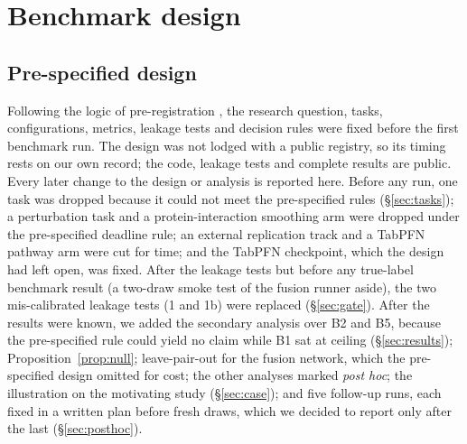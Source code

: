 \documentclass[10pt,letterpaper]{article}
\begin{document}
\section{Benchmark design}

\subsection{Pre-specified design}
Following the logic of pre-registration \citep{nosek2018prereg}, the research question, tasks,
configurations, metrics, leakage tests and decision rules were fixed before the first benchmark run. The
design was not lodged with a public registry, so its timing rests on our own record; the code, leakage tests
and complete results are public. Every later change to the design or analysis is reported here. Before
any run, one task was
dropped because it could not meet the pre-specified rules (\S\ref{sec:tasks}); a perturbation task and a
protein-interaction smoothing arm were dropped under the pre-specified deadline rule; an external replication
track and a TabPFN pathway arm were cut for time; and the TabPFN checkpoint, which the design had left open, was
fixed. After the leakage tests but before any true-label benchmark result (a two-draw smoke test of the fusion
runner aside), the two mis-calibrated leakage tests (1 and 1b) were replaced (\S\ref{sec:gate}). After the results were known, we added the secondary analysis over B2
and B5, because the pre-specified rule could yield no claim while B1 sat at ceiling (\S\ref{sec:results});
Proposition~\ref{prop:null}; leave-pair-out for the fusion network, which the pre-specified design omitted for
cost; the other analyses marked \emph{post hoc}; the illustration on the motivating study
(\S\ref{sec:case}); and five follow-up runs, each fixed in a written plan before fresh draws, which we decided to report only after
the last (\S\ref{sec:posthoc}).
\end{document}
